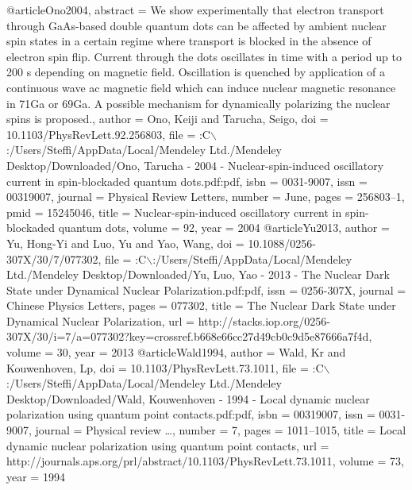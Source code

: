 @article{Ono2004,
abstract = {We show experimentally that electron transport through GaAs-based double quantum dots can be affected by ambient nuclear spin states in a certain regime where transport is blocked in the absence of electron spin flip. Current through the dots oscillates in time with a period up to 200 s depending on magnetic field. Oscillation is quenched by application of a continuous wave ac magnetic field which can induce nuclear magnetic resonance in 71Ga or 69Ga. A possible mechanism for dynamically polarizing the nuclear spins is proposed.},
author = {Ono, Keiji and Tarucha, Seigo},
doi = {10.1103/PhysRevLett.92.256803},
file = {:C$\backslash$:/Users/Steffi/AppData/Local/Mendeley Ltd./Mendeley Desktop/Downloaded/Ono, Tarucha - 2004 - Nuclear-spin-induced oscillatory current in spin-blockaded quantum dots.pdf:pdf},
isbn = {0031-9007},
issn = {00319007},
journal = {Physical Review Letters},
number = {June},
pages = {256803--1},
pmid = {15245046},
title = {{Nuclear-spin-induced oscillatory current in spin-blockaded quantum dots}},
volume = {92},
year = {2004}
}
@article{Yu2013,
author = {Yu, Hong-Yi and Luo, Yu and Yao, Wang},
doi = {10.1088/0256-307X/30/7/077302},
file = {:C$\backslash$:/Users/Steffi/AppData/Local/Mendeley Ltd./Mendeley Desktop/Downloaded/Yu, Luo, Yao - 2013 - The Nuclear Dark State under Dynamical Nuclear Polarization.pdf:pdf},
issn = {0256-307X},
journal = {Chinese Physics Letters},
pages = {077302},
title = {{The Nuclear Dark State under Dynamical Nuclear Polarization}},
url = {http://stacks.iop.org/0256-307X/30/i=7/a=077302?key=crossref.b668e66cc27d49cb0c9d5e87666a7f4d},
volume = {30},
year = {2013}
}
@article{Wald1994,
author = {Wald, Kr and Kouwenhoven, Lp},
doi = {10.1103/PhysRevLett.73.1011},
file = {:C$\backslash$:/Users/Steffi/AppData/Local/Mendeley Ltd./Mendeley Desktop/Downloaded/Wald, Kouwenhoven - 1994 - Local dynamic nuclear polarization using quantum point contacts.pdf:pdf},
isbn = {00319007},
issn = {0031-9007},
journal = {Physical review {\ldots}},
number = {7},
pages = {1011--1015},
title = {{Local dynamic nuclear polarization using quantum point contacts}},
url = {http://journals.aps.org/prl/abstract/10.1103/PhysRevLett.73.1011},
volume = {73},
year = {1994}
}
